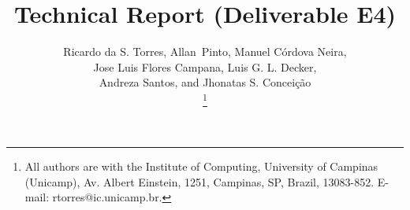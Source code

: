 \documentclass[journal, onecolumn, 12pt, draftcls]{IEEEtran}
\begin{document}
    \title{Technical Report (Deliverable E4)}
    
    \author{
        Ricardo da S. Torres,
        Allan~Pinto,
        Manuel C\'{o}rdova Neira,\\
        Jose Luis Flores Campana,
        Luis G. L. Decker, \\
        Andreza Santos, and
        Jhonatas S. Concei\c{c}\~{a}o

        \thanks{All authors are with the Institute of Computing, University of Campinas (Unicamp), Av. Albert Einstein, 1251, Campinas, SP, Brazil, 13083-852. E-mail: rtorres@ic.unicamp.br.}%

        }
    
    
\end{document}
